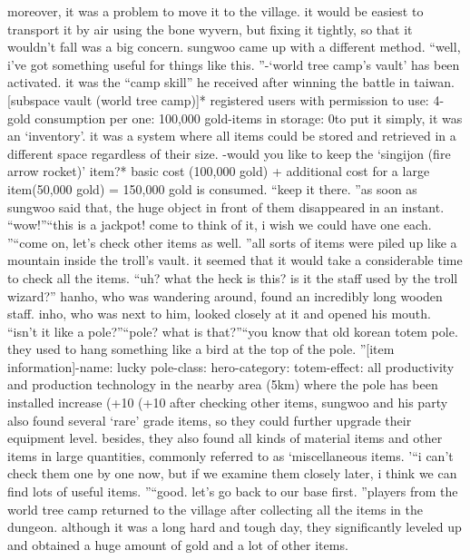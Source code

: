 moreover, it was a problem to move it to the village.
 it would be easiest to transport it by air using the bone wyvern, but fixing it tightly, so that it wouldn’t fall was a big concern.
sungwoo came up with a different method.
“well, i’ve got something useful for things like this.
”-‘world tree camp’s vault’ has been activated.
it was the “camp skill” he received after winning the battle in taiwan.
[subspace vault (world tree camp)]* registered users with permission to use: 4-gold consumption per one: 100,000 gold-items in storage: 0to put it simply, it was an ‘inventory’.
 it was a system where all items could be stored and retrieved in a different space regardless of their size.
-would you like to keep the ‘singijon (fire arrow rocket)’ item?* basic cost (100,000 gold) + additional cost for a large item(50,000 gold) = 150,000 gold is consumed.
“keep it there.
”as soon as sungwoo said that, the huge object in front of them disappeared in an instant.
“wow!”“this is a jackpot! come to think of it, i wish we could have one each.
”“come on, let’s check other items as well.
”all sorts of items were piled up like a mountain inside the troll’s vault.
 it seemed that it would take a considerable time to check all the items.
“uh? what the heck is this? is it the staff used by the troll wizard?”
hanho, who was wandering around, found an incredibly long wooden staff.
inho, who was next to him, looked closely at it and opened his mouth.
“isn’t it like a pole?”“pole? what is that?”“you know that old korean totem pole.
 they used to hang something like a bird at the top of the pole.
”[item information]-name: lucky pole-class: hero-category: totem-effect: all productivity and production technology in the nearby area (5km) where the pole has been installed increase (+10%
 (+10%
after checking other items, sungwoo and his party also found several ‘rare’ grade items, so they could further upgrade their equipment level.
besides, they also found all kinds of material items and other items in large quantities, commonly referred to as ‘miscellaneous items.
’“i can’t check them one by one now, but if we examine them closely later, i think we can find lots of useful items.
”“good.
 let’s go back to our base first.
”players from the world tree camp returned to the village after collecting all the items in the dungeon.
although it was a long hard and tough day, they significantly leveled up and obtained a huge amount of gold and a lot of other items.
